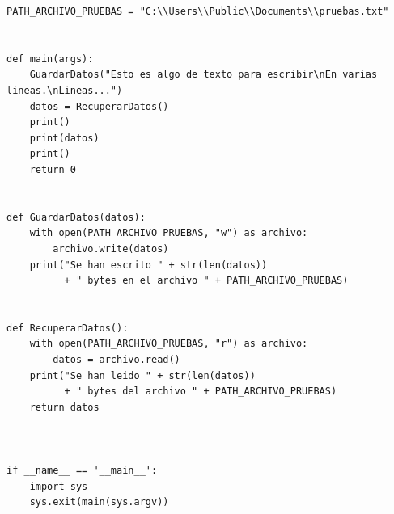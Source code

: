 \documentclass[spanish,12pt,a4paper,final,oneside]{book}
\begin{document}
\begin{lstlisting}[frame=single, caption=lenguaje Python]
PATH_ARCHIVO_PRUEBAS = "C:\\Users\\Public\\Documents\\pruebas.txt"


def main(args):
    GuardarDatos("Esto es algo de texto para escribir\nEn varias lineas.\nLineas...")
    datos = RecuperarDatos()
    print()
    print(datos)
    print()
    return 0
    
    
def GuardarDatos(datos):
    with open(PATH_ARCHIVO_PRUEBAS, "w") as archivo:
        archivo.write(datos)
    print("Se han escrito " + str(len(datos)) 
          + " bytes en el archivo " + PATH_ARCHIVO_PRUEBAS)
    
    
def RecuperarDatos():
    with open(PATH_ARCHIVO_PRUEBAS, "r") as archivo:
        datos = archivo.read()
    print("Se han leido " + str(len(datos)) 
          + " bytes del archivo " + PATH_ARCHIVO_PRUEBAS)
    return datos



if __name__ == '__main__':
    import sys
    sys.exit(main(sys.argv))

\end{lstlisting}
\end{document}
